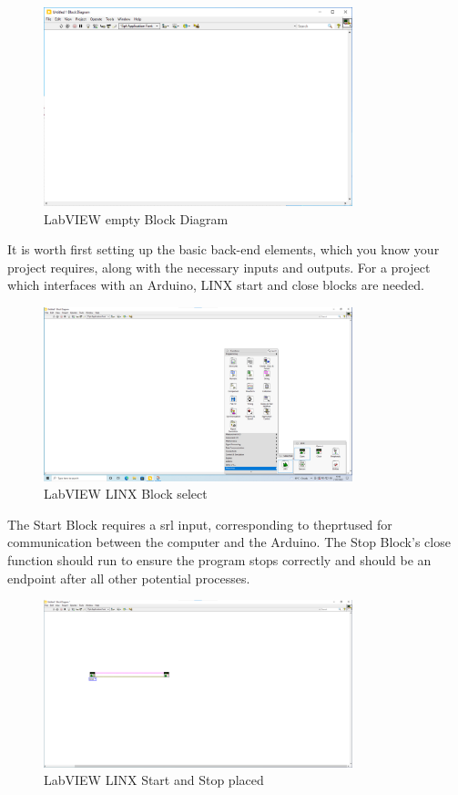 \documentclass[a4paper,11pt]{report}
\begin{document}
\begin{figure}[H]
\centering
\includegraphics[width=0.8\textwidth]{screenshots/labview4}
\caption{LabVIEW empty Block Diagram}
\end{figure}

It is worth first setting up the basic back-end elements, which you know your project requires, along with the necessary inputs and outputs. For a project which interfaces with an Arduino, LINX start and close blocks are needed.

\begin{figure}[H]
\centering
\includegraphics[width=0.8\textwidth]{screenshots/labview6}
\caption{LabVIEW LINX Block select}
\end{figure}

The Start Block requires a \gls{srl} input, corresponding to the\gls{prt}used for communication between the computer and the Arduino. The Stop Block's close function should run to ensure the program stops correctly and should be an endpoint after all other potential processes.

\begin{figure}[H]
\centering
\includegraphics[width=0.8\textwidth]{screenshots/labview7}
\caption{LabVIEW LINX Start and Stop placed}
\end{figure}
\end{document}
